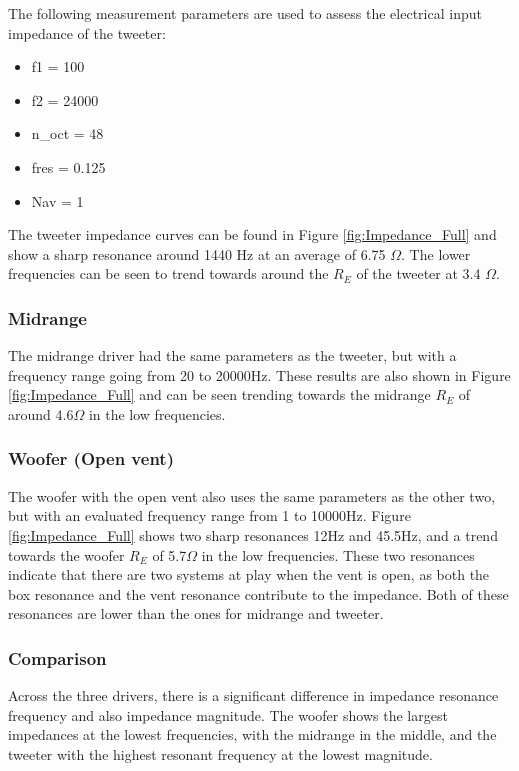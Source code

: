 \documentclass[a4paper,10pt]{article}
\begin{document}
The following measurement parameters are used to assess the electrical input impedance of the tweeter:

\begin{itemize}
    \item[] f1 = 100
    \item[] f2 = 24000
    \item[] n\_oct = 48
    \item[] fres = 0.125
    \item[] Nav = 1
\end{itemize}



The tweeter impedance curves can be found in Figure \ref{fig:Impedance_Full} and show a sharp resonance around 1440 Hz at an average of 6.75 $\Omega$. The lower frequencies can be seen to trend towards  around the $R_E$ of the tweeter at 3.4 $\Omega$.


\subsubsection{Midrange}
The midrange driver had the same parameters as the tweeter, but with a frequency range going from 20 to 20000Hz. These results are also shown in Figure \ref{fig:Impedance_Full} and can be seen trending towards the midrange $R_E$ of around 4.6$\Omega$ in the low frequencies.

\subsubsection{Woofer (Open vent)}
The woofer with the open vent also uses the same parameters as the other two, but with an evaluated frequency range from 1 to 10000Hz. Figure \ref{fig:Impedance_Full} shows two sharp resonances 12Hz and 45.5Hz, and a trend towards the woofer $R_E$ of 5.7$\Omega$ in the low frequencies. These two resonances indicate that there are two systems at play when the vent is open, as both the box resonance and the vent resonance contribute to the impedance. Both of these resonances are lower than the ones for midrange and tweeter.

\subsubsection{Comparison}

Across the three drivers, there is a significant difference in impedance resonance frequency and also impedance magnitude. The woofer shows the largest impedances at the lowest frequencies, with the midrange in the middle, and the tweeter with the highest resonant frequency at the lowest magnitude.
\end{document}
